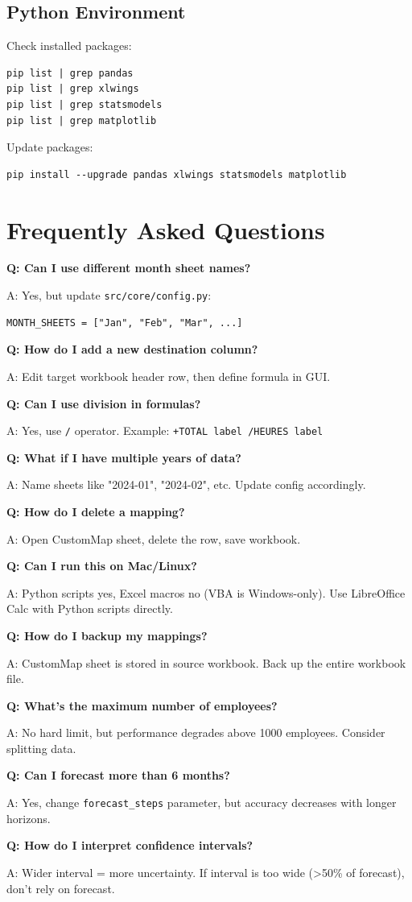 \subsection{Python Environment}

Check installed packages:

\begin{lstlisting}
pip list | grep pandas
pip list | grep xlwings
pip list | grep statsmodels
pip list | grep matplotlib
\end{lstlisting}

Update packages:

\begin{lstlisting}
pip install --upgrade pandas xlwings statsmodels matplotlib
\end{lstlisting}

\section{Frequently Asked Questions}

\textbf{Q: Can I use different month sheet names?}

A: Yes, but update \texttt{src/core/config.py}:
\begin{lstlisting}[style=pythonstyle]
MONTH_SHEETS = ["Jan", "Feb", "Mar", ...]
\end{lstlisting}

\textbf{Q: How do I add a new destination column?}

A: Edit target workbook header row, then define formula in GUI.

\textbf{Q: Can I use division in formulas?}

A: Yes, use \texttt{/} operator. Example: \texttt{+TOTAL label /HEURES label}

\textbf{Q: What if I have multiple years of data?}

A: Name sheets like "2024-01", "2024-02", etc. Update config accordingly.

\textbf{Q: How do I delete a mapping?}

A: Open CustomMap sheet, delete the row, save workbook.

\textbf{Q: Can I run this on Mac/Linux?}

A: Python scripts yes, Excel macros no (VBA is Windows-only). Use LibreOffice Calc with Python scripts directly.

\textbf{Q: How do I backup my mappings?}

A: CustomMap sheet is stored in source workbook. Back up the entire workbook file.

\textbf{Q: What's the maximum number of employees?}

A: No hard limit, but performance degrades above 1000 employees. Consider splitting data.

\textbf{Q: Can I forecast more than 6 months?}

A: Yes, change \texttt{forecast\_steps} parameter, but accuracy decreases with longer horizons.

\textbf{Q: How do I interpret confidence intervals?}

A: Wider interval = more uncertainty. If interval is too wide (>50\% of forecast), don't rely on forecast.

